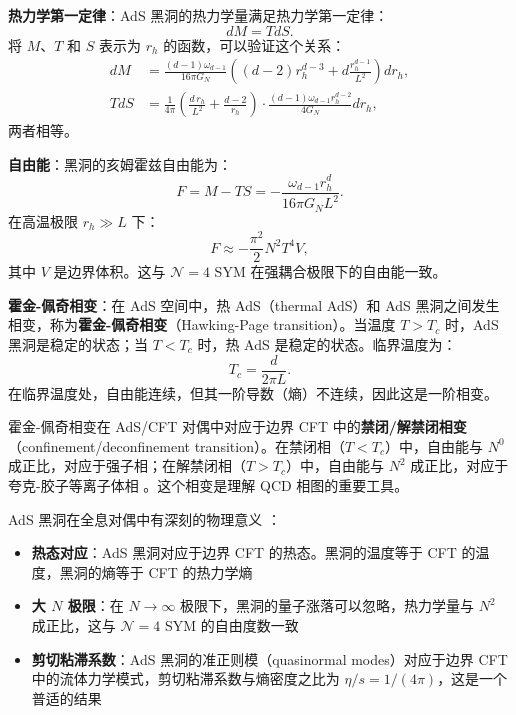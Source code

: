 \textbf{热力学第一定律}：AdS 黑洞的热力学量满足热力学第一定律：
\begin{equation}
    dM = T dS.
\end{equation}
将 $M$、$T$ 和 $S$ 表示为 $r_h$ 的函数，可以验证这个关系：
\begin{align}
    dM &= \frac{(d-1) \omega_{d-1}}{16\pi G_N} \left( (d-2) r_h^{d-3} + d \frac{r_h^{d-1}}{L^2} \right) dr_h, \\
    T dS &= \frac{1}{4\pi} \left( \frac{d \, r_h}{L^2} + \frac{d-2}{r_h} \right) \cdot \frac{(d-1) \omega_{d-1} r_h^{d-2}}{4G_N} dr_h,
\end{align}
两者相等。

\textbf{自由能}：黑洞的亥姆霍兹自由能为：
\begin{equation}
    F = M - TS = -\frac{\omega_{d-1} r_h^d}{16\pi G_N L^2}.
\end{equation}
在高温极限 $r_h \gg L$ 下：
\begin{equation}
    F \approx -\frac{\pi^2}{2} N^2 T^4 V,
\end{equation}
其中 $V$ 是边界体积。这与 $\mathcal{N}=4$ SYM 在强耦合极限下的自由能一致。

\textbf{霍金-佩奇相变}：在 AdS 空间中，热 AdS（thermal AdS）和 AdS 黑洞之间发生相变，称为\textbf{霍金-佩奇相变}（Hawking-Page transition）\cite{Hawking1983}。当温度 $T > T_c$ 时，AdS 黑洞是稳定的状态；当 $T < T_c$ 时，热 AdS 是稳定的状态。临界温度为：
\begin{equation}
    T_c = \frac{d}{2\pi L}.
\end{equation}
在临界温度处，自由能连续，但其一阶导数（熵）不连续，因此这是一阶相变。

\begin{remark}
霍金-佩奇相变在 AdS/CFT 对偶中对应于边界 CFT 中的\textbf{禁闭/解禁闭相变}（confinement/deconfinement transition）\cite{Witten1998b}。在禁闭相（$T < T_c$）中，自由能与 $N^0$ 成正比，对应于强子相；在解禁闭相（$T > T_c$）中，自由能与 $N^2$ 成正比，对应于夸克-胶子等离子体相 \cite{Aharony1999}。这个相变是理解 QCD 相图的重要工具。
\end{remark}

\begin{remark}
AdS 黑洞在全息对偶中有深刻的物理意义 \cite{Aharony1999}：
\begin{itemize}
    \item \textbf{热态对应}：AdS 黑洞对应于边界 CFT 的热态。黑洞的温度等于 CFT 的温度，黑洞的熵等于 CFT 的热力学熵
    \item \textbf{大 $N$ 极限}：在 $N \to \infty$ 极限下，黑洞的量子涨落可以忽略，热力学量与 $N^2$ 成正比，这与 $\mathcal{N}=4$ SYM 的自由度数一致
    \item \textbf{剪切粘滞系数}：AdS 黑洞的准正则模（quasinormal modes）对应于边界 CFT 中的流体力学模式，剪切粘滞系数与熵密度之比为 $\eta/s = 1/(4\pi)$，这是一个普适的结果 \cite{Policastro2001, Kovtun2005}
\end{itemize}
\end{remark}

